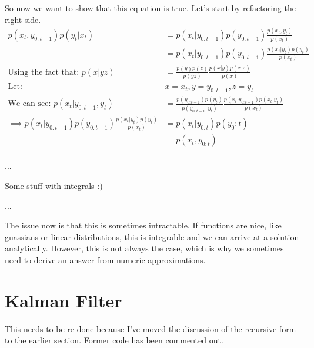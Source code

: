 \documentclass{article}
\begin{document}
So now we want to show that this equation is true. Let's start by refactoring the right-side.
\begin{equation}
\begin{split}
p(x_t,y_{0:t-1})p(y_t|x_t) 
&=p(x_t|y_{0:t-1})p(y_{0:t-1})\frac{p(x_t,y_t)}{p(x_t)}\\
&=p(x_t|y_{0:t-1})p(y_{0:t-1})\frac{p(x_t|y_t)p(y_t)}{p(x_t)}\\
\text{Using the fact that: }
p(x|yz) &= \frac{p(y)p(z)}{p(yz)}\frac{p(x|y)p(x|z)}{p(x)}\\
\text{Let: }
& x=x_t, y=y_{0:t-1}, z = y_t\\
\text{We can see: }
p(x_t|y_{0:t-1},y_t) &= \frac{p(y_{0:t-1})p(y_t)}{p(y_{0:t-1},y_t)}\frac{p(x_t|y_{0:t-1})p(x_t|y_t)}{p(x_t)}\\
\implies
p(x_t|y_{0:t-1})p(y_{0:t-1})\frac{p(x_t|y_t)p(y_t)}{p(x_t)} &= p(x_t|y_{0:t})p(y_0:t)\\
&= p(x_t,y_{0:t})\\
\end{split}
\end{equation}


...


Some stuff with integrals :)

...

The issue now is that this is sometimes intractable. If functions are nice, like guassians or linear distributions, this is integrable and we can arrive at a solution analytically. However, this is not always the case, which is why we sometimes need to derive an answer from numeric approximations.

\section{Kalman Filter}

This needs to be re-done because I've moved the discussion of the recursive form to the earlier section. Former code has been commented out. 

\end{document}

